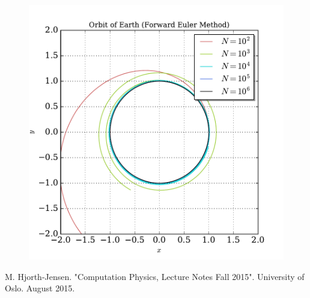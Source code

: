 \documentclass[prb,aps,twocolumn,showpacs,10pt]{revtex4-1}
\begin{document}
\begin{center}
\begin{figure}
\includegraphics[scale=0.7]{binary_euler_orbit.pdf}
\end{figure}
\end{center}




\newpage 
\begin{references}
 M. Hjorth-Jensen. "Computation Physics, Lecture Notes Fall 2015". University of Oslo. August 2015.
\end{references}
\end{document}
